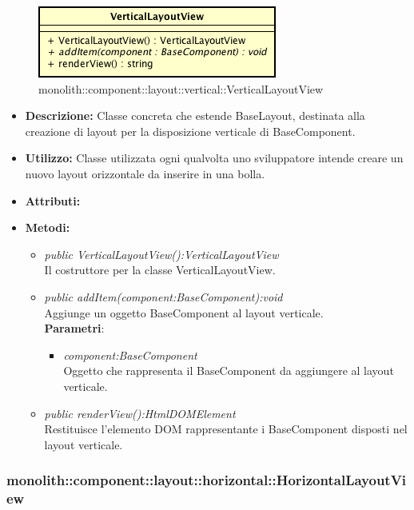 \label{monolith::component::layout::vertical::VerticalLayoutView}
\begin{figure}[H]
	\centering
	\includegraphics[scale=0.5]{Sezioni/SottosezioniST/img/VerticalLayoutView.png}
	\caption{monolith::component::layout::vertical::VerticalLayoutView}
\end{figure}

\begin{itemize}
\item \textbf{Descrizione:} Classe concreta che estende BaseLayout, destinata alla creazione di layout per la disposizione verticale di BaseComponent.
\item \textbf{Utilizzo:} Classe utilizzata ogni qualvolta uno sviluppatore intende creare un nuovo layout orizzontale da inserire in una bolla.
\item \textbf{Attributi:}
\item \textbf{Metodi:}
\begin{itemize}
\item\textit{public VerticalLayoutView():VerticalLayoutView}\\
Il costruttore per la classe VerticalLayoutView.
\item \textit{public addItem(component:BaseComponent):void}\\
Aggiunge un oggetto BaseComponent al layout verticale.
\\ \textbf{Parametri}: \begin{itemize}
\item \textit{component:BaseComponent}\\
Oggetto che rappresenta il BaseComponent da aggiungere al layout verticale.
\end{itemize}
\item \textit{public renderView():HtmlDOMElement}\\
Restituisce l'elemento DOM rappresentante i BaseComponent disposti nel layout verticale.
\end{itemize}
\end{itemize}

\subsubsection{monolith::component::layout::horizontal::HorizontalLayoutView}

